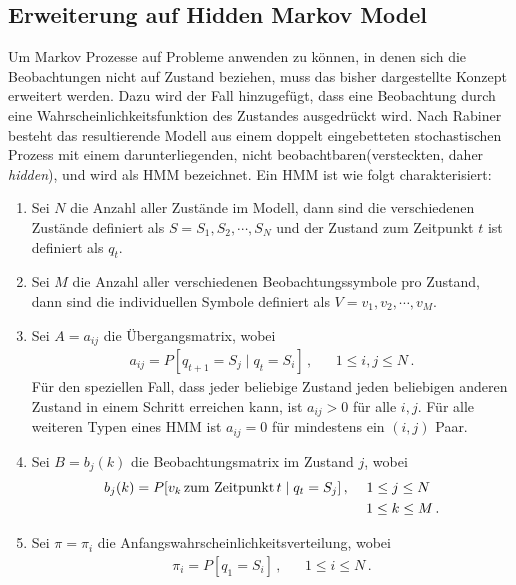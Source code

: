 \subsection{Erweiterung auf Hidden Markov Model}
\label{subsec:HMM}
Um Markov Prozesse auf Probleme anwenden zu k\"onnen, in denen sich die Beobachtungen nicht auf Zustand beziehen, muss das bisher dargestellte Konzept erweitert werden. Dazu wird der Fall hinzugef\"ugt, dass eine Beobachtung durch eine Wahrscheinlichkeitsfunktion des Zustandes ausgedr\"uckt wird. Nach Rabiner~\cite{bib:hmmrabiner} besteht das resultierende Modell aus einem doppelt eingebetteten stochastischen Prozess mit einem darunterliegenden, nicht beobachtbaren(versteckten, daher \textit{hidden}),  und wird als \gls{HMM} bezeichnet.
\newline
Ein \acrshort{HMM} ist wie folgt charakterisiert:
\begin{enumerate}
\item Sei $N$ die Anzahl aller Zust\"ande im Modell, dann sind die verschiedenen Zust\"ande definiert als $S = {S_1, S_2, \cdots, S_N}$ und der Zustand zum Zeitpunkt $t$ ist definiert als $q_t$.
\item Sei $M$ die Anzahl aller verschiedenen Beobachtungssymbole pro Zustand, dann sind die individuellen Symbole definiert als $V = {v_1, v_2, \cdots, v_M}$.
\item Sei $A = {a_{ij}}$ die \"Ubergangsmatrix, wobei
\begin{align}
a_{ij} = P[q_{t+1} = S_j \mid q_t = S_i] \, , & & 1 \leq i, j \leq N \, .
\end{align}
F\"ur den speziellen Fall, dass jeder beliebige Zustand jeden beliebigen anderen Zustand in einem Schritt erreichen kann, ist $a_{ij} > 0$ f\"ur alle $i, j$. F\"ur alle weiteren Typen eines \acrshort{HMM} ist $a_{ij} = 0$ f\"ur mindestens ein $(i, j)$ Paar.
\item Sei $B = {b_j(k)}$ die Beobachtungsmatrix im Zustand $j$, wobei
\begin{align}
b_j(k) = P[v_k \,\mbox{zum Zeitpunkt} \, t \mid q_t = S_j]\, , & & 1 \leq j \leq N \, \, \, \,  \notag \\
& & \, \, 1 \leq k \leq M \, .
\end{align}
\item Sei $\pi = {\pi_i}$ die Anfangswahrscheinlichkeitsverteilung, wobei
\begin{align}
\pi_i = P [q_1 = S_i] \, , & & 1 \leq i \leq N \, .
\end{align}
\end{enumerate}
